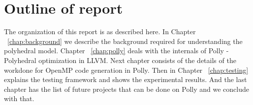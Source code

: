 \section{Outline of report}
The organization of this report is as described here. In Chapter ~\ref{chap:background} we
describe the background required for understanding the polyhedral model. Chapter ~\ref{chap:polly}
deals with the internals of Polly - Polyhedral optimization in LLVM. Next chapter consists of
the details of the workdone for OpenMP code generation in Polly. Then in Chapter ~\ref{chap:testing}
explains the testing framework and shows the experimental results. And the last chapter
has the list of future projects that can be done on Polly and we conclude with that.

